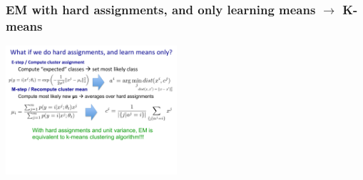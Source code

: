 \subsubsection{EM with hard assignments, and only learning means $\rightarrow$ K-means}

\includegraphics[width=2.5in]{figures/em_to_kmeans.pdf}


